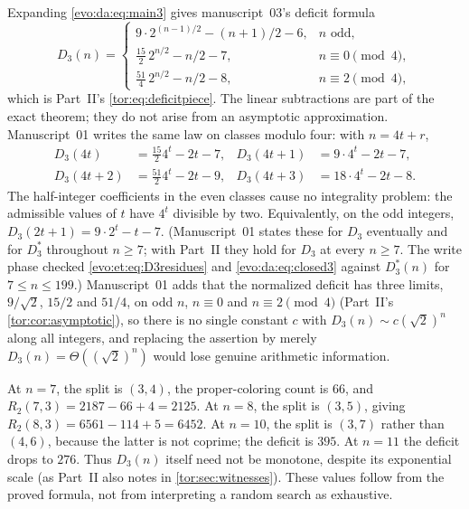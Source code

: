 \documentclass[11pt,a4paper]{article}
\numberwithin{equation}{section}
\theoremstyle{definition}
\theoremstyle{remark}
\begin{document}
Expanding \eqref{evo:da:eq:main3} gives manuscript~03's deficit formula
\begin{equation}\label{evo:da:eq:closed3}
D_3(n)=
\begin{cases}
9\cdot2^{(n-1)/2}-(n+1)/2-6,&n\text{ odd},\\
\frac{15}{2}\,2^{n/2}-n/2-7,&n\equiv0\pmod4,\\
\frac{51}{4}\,2^{n/2}-n/2-8,&n\equiv2\pmod4,
\end{cases}
\end{equation}
which is Part~II's \eqref{tor:eq:deficitpiece}. The linear subtractions are
part of the exact theorem; they do not arise from an asymptotic
approximation. Manuscript~01 writes the same law on classes modulo four:
with $n=4t+r$,
\begin{equation}\label{evo:et:eq:D3residues}
\begin{aligned}
 D_3(4t)&=\tfrac{15}{2}4^t-2t-7, &
 D_3(4t+1)&=9\cdot4^t-2t-7,\\
 D_3(4t+2)&=\tfrac{51}{2}4^t-2t-9, &
 D_3(4t+3)&=18\cdot4^t-2t-8.
\end{aligned}
\end{equation}
The half-integer coefficients in the even classes cause no integrality
problem: the admissible values of $t$ have $4^t$ divisible by two.
Equivalently, on the odd integers, $D_3(2t+1)=9\cdot2^t-t-7$. (Manuscript~01
states these for $D_3$ eventually and for $D^*_3$ throughout $n\ge7$; with
Part~II they hold for $D_3$ at every $n\ge7$. The write phase checked
\eqref{evo:et:eq:D3residues} and \eqref{evo:da:eq:closed3} against $D^*_3(n)$
for $7\le n\le199$.) Manuscript~01 adds that the normalized deficit has three
limits, $9/\sqrt2$, $15/2$ and $51/4$, on odd $n$, $n\equiv0$ and
$n\equiv2\pmod4$ (Part~II's \cref{tor:cor:asymptotic}), so there is no single
constant $c$ with $D_3(n)\sim c(\sqrt2)^n$ along all integers, and replacing
the assertion by merely $D_3(n)=\Theta((\sqrt2)^n)$ would lose genuine
arithmetic information.

At $n=7$, the split is $(3,4)$, the proper-coloring count is $66$, and
$R_2(7,3)=2187-66+4=2125$. At $n=8$, the split is $(3,5)$, giving
$R_2(8,3)=6561-114+5=6452$. At $n=10$, the split is $(3,7)$ rather than
$(4,6)$, because the latter is not coprime; the deficit is $395$. At $n=11$
the deficit drops to $276$. Thus $D_3(n)$ itself need not be monotone, despite
its exponential scale (as Part~II also notes in \cref{tor:sec:witnesses}).
These values follow from the proved formula, not from interpreting a random
search as exhaustive.
\end{document}
